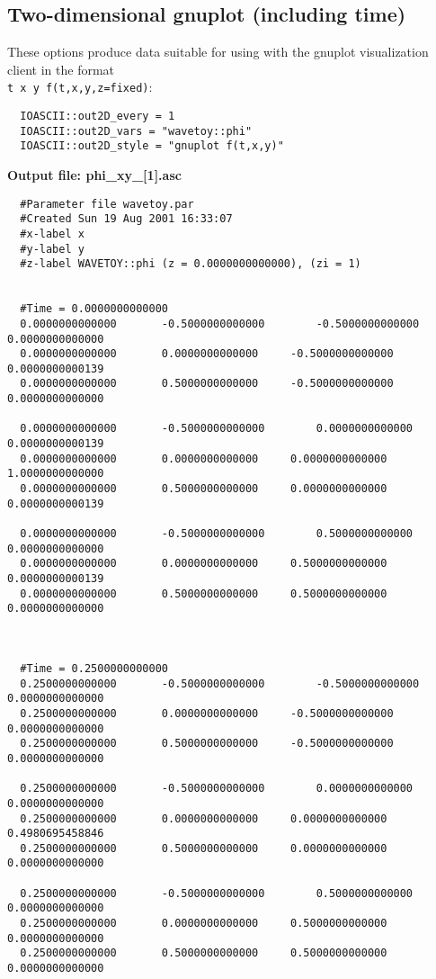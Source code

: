 \documentclass{article}
\begin{document}
\subsection{Two-dimensional gnuplot (including time)}

These options produce data suitable for using with the gnuplot visualization client in the format\\ {\tt t x y f(t,x,y,z=fixed)}:

\begin{verbatim}
  IOASCII::out2D_every = 1
  IOASCII::out2D_vars = "wavetoy::phi"
  IOASCII::out2D_style = "gnuplot f(t,x,y)"
\end{verbatim}


\noindent
{\bf Output file: phi\_xy\_[1].asc}

\begin{verbatim}
  #Parameter file wavetoy.par
  #Created Sun 19 Aug 2001 16:33:07
  #x-label x
  #y-label y
  #z-label WAVETOY::phi (z = 0.0000000000000), (zi = 1)


  #Time = 0.0000000000000
  0.0000000000000		-0.5000000000000		-0.5000000000000		0.0000000000000
  0.0000000000000		0.0000000000000		-0.5000000000000		0.0000000000139
  0.0000000000000		0.5000000000000		-0.5000000000000		0.0000000000000

  0.0000000000000		-0.5000000000000		0.0000000000000		0.0000000000139
  0.0000000000000		0.0000000000000		0.0000000000000		1.0000000000000
  0.0000000000000		0.5000000000000		0.0000000000000		0.0000000000139

  0.0000000000000		-0.5000000000000		0.5000000000000		0.0000000000000
  0.0000000000000		0.0000000000000		0.5000000000000		0.0000000000139
  0.0000000000000		0.5000000000000		0.5000000000000		0.0000000000000



  #Time = 0.2500000000000
  0.2500000000000		-0.5000000000000		-0.5000000000000		0.0000000000000
  0.2500000000000		0.0000000000000		-0.5000000000000		0.0000000000000
  0.2500000000000		0.5000000000000		-0.5000000000000		0.0000000000000

  0.2500000000000		-0.5000000000000		0.0000000000000		0.0000000000000
  0.2500000000000		0.0000000000000		0.0000000000000		0.4980695458846
  0.2500000000000		0.5000000000000		0.0000000000000		0.0000000000000

  0.2500000000000		-0.5000000000000		0.5000000000000		0.0000000000000
  0.2500000000000		0.0000000000000		0.5000000000000		0.0000000000000
  0.2500000000000		0.5000000000000		0.5000000000000		0.0000000000000




\end{verbatim}
\end{document}
